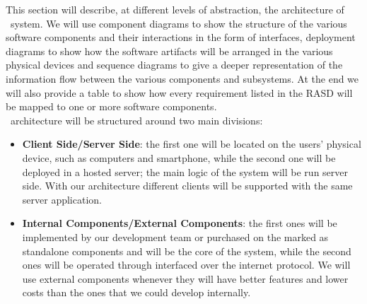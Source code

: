 This section will describe, at different levels of abstraction, the architecture of \projectname~system. We will use component diagrams to show the structure of the various software components and their interactions in the form of interfaces, deployment diagrams to show how the software artifacts will be arranged in the various physical devices and sequence diagrams to give a deeper representation of the information flow between the various components and subsystems. At the end we will also provide a table to show how every requirement listed in the RASD will be mapped to one or more software components. \\
\projectname~architecture will be structured around two main divisions:
\begin{itemize}
\item \textbf{Client Side/Server Side}: the first one will be located on the users' physical device, such as computers and smartphone, while the second one will be deployed in a hosted server; the main logic of the system will be run server side. With our architecture different clients will be supported with the same server application.
\item \textbf{Internal Components/External Components}: the first ones will be implemented by our development team or purchased on the marked as standalone components and will be the core of the system, while the second ones will be operated through interfaced over the internet protocol. We will use external components whenever they will have better features and lower costs than the ones that we could develop internally.
\end{itemize}